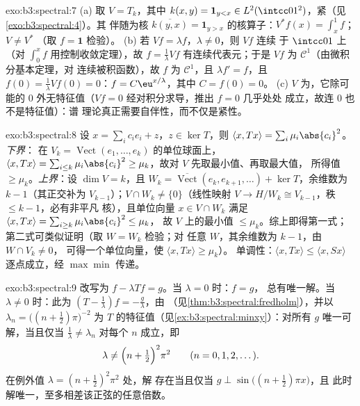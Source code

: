 \begin{solution}{exo:b3:spectral:7}
(a) 取 $V = T_k$，其中 $k(x, y) = \mathbf 1_{y < x} \in
L^2(\intcc01^2)$，紧（见\cref{exo:b3:spectral:4}）。其
伴随为核 $\overline{k(y,
x)} = \mathbf 1_{y > x}$ 的核算子：$V^*f(x) = \int_x^1f$；$V \neq V^*$
（取 $f = \mathbf 1$ 检验）。
(b) 若 $Vf = \lambda f$，$\lambda \ne 0$，则 $Vf$ 连续
于 $\intcc01$ 上（对 $\int_0^x f$ 用控制收敛定理），故 $f
= \frac1\lambda Vf$ 有连续代表元；于是
$Vf$ 为 $\mathcal C^1$（由微积分基本定理，对
连续被积函数），故 $f$ 为 $\mathcal C^1$，且
$\lambda f' = f$，且 $f(0) = \frac1\lambda Vf(0) = 0$：$f =
C\eu^{x/\lambda}$，其中 $C = f(0) = 0$。
(c) $V$ 为，它除可能的
$0$ 外无特征值（$Vf = 0$ 经对积分求导，推出 $f = 0$ 几乎处处
成立，故连 $0$ 也不是特征值）：谱
理论真正需要自伴性，而不仅是紧性。
\end{solution}

\begin{solution}{exo:b3:spectral:8}
设 $x = \sum_ic_ie_i + z$，$z \in \ker T$，则 $\langle x,
Tx\rangle = \sum_i\mu_i\abs{c_i}^2$。\emph{下界}：
在 $V_k = \operatorname{Vect}(e_1, \dots,
e_k)$ 的单位球面上，$\langle x, Tx\rangle = \sum_{i\leq
k}\mu_i\abs{c_i}^2 \geq \mu_k$，故对 $V$ 先取最小值、再取最大值，
所得值 $\geq \mu_k$。\emph{上界}：设 $\dim V = k$，且 $W_k
= \overline{\operatorname{Vect}}(e_k, e_{k+1}, \dots) +
\ker T$，余维数为 $k - 1$（其正交补为
$V_{k-1}$）；$V \cap W_k \neq \{0\}$（线性映射 $V \to
H/W_k \cong V_{k-1}$，秩 $\leq k - 1$，必有非平凡
核），且单位向量 $x \in V\cap W_k$ 满足 $\langle x,
Tx\rangle = \sum_{i \geq k}\mu_i\abs{c_i}^2 \leq \mu_k$，
故 $V$ 上的最小值 $\leq \mu_k$。综上即得第一式；
第二式可类似证明（取 $W = W_k$ 检验；对
任意 $W$，其余维数为 $k-1$，由 $W \cap V_k \neq 0$，
可得一个单位向量，使 $\langle x, Tx\rangle \geq \mu_k$）。
单调性：$\langle x, Tx\rangle \leq \langle x,
Sx\rangle$ 逐点成立，经 $\max\min$ 传递。
\end{solution}

\begin{solution}{exo:b3:spectral:9}
改写为 $f - \lambda Tf = g$。当 $\lambda = 0$ 时：$f = g$，
总有唯一解。当 $\lambda \neq 0$ 时：此为
$(T - \frac1\lambda)f = -\frac g\lambda$，由
（见\cref{thm:b3:spectral:fredholm}），并以
$\lambda_n = \bigl((n + \frac12)\pi\bigr)^{-2}$ 为
$T$ 的特征值（见\cref{ex:b3:spectral:minxy}）：对所有 $g$ 唯一可解，当且仅当
$\frac1\lambda \neq \lambda_n$ 对每个 $n$ 成立，即
\[
\lambda \neq \Bigl(n + \tfrac12\Bigr)^2\pi^2
\qquad (n = 0, 1, 2, \dots).
\]
在例外值 $\lambda = (n+\frac12)^2\pi^2$ 处，解
存在当且仅当 $g \perp \sin\bigl((n{+}\frac12)\pi x\bigr)$，且
此时解唯一，至多相差该正弦的任意倍数。
\end{solution}

